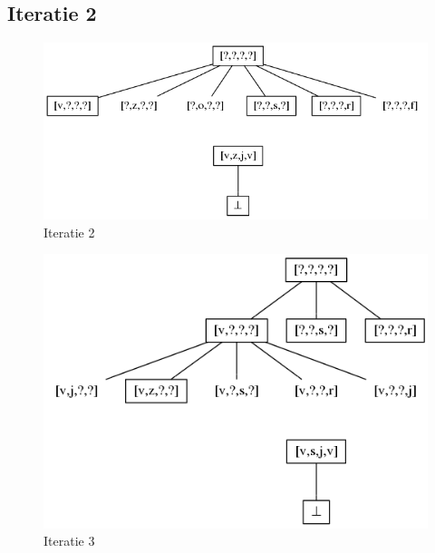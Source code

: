 \documentclass[alternative-exam.tex]{subfiles}
\begin{document}
\subsection{Iteratie 2}
\begin{figure}
[H]
\centering
\caption{Iteratie 2}
\label{iter_2}
\includegraphics[scale=0.5]{resources/graphs/iteration_2.png}
\end{figure}
\begin{figure}
[H]
\centering
\caption{Iteratie 3}
\label{iter_3}
\includegraphics[scale=0.5]{resources/graphs/iteration_3.png}
\end{figure}
\end{document}
